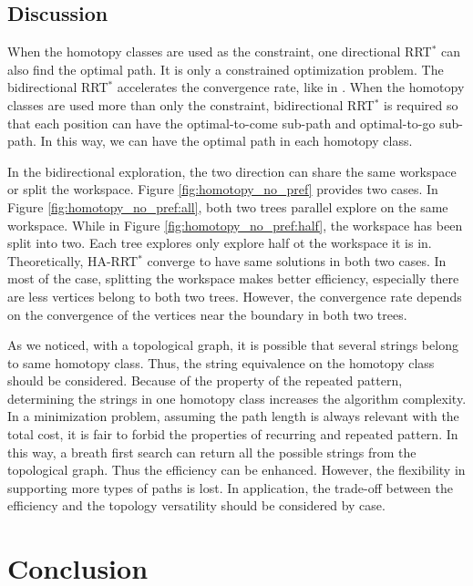 \documentclass[letterpaper, 10 pt, conference]{ieeeconf}
\begin{document}
\subsection{Discussion}

When the homotopy classes are used as the constraint, one directional RRT$^{*}$ can also find the optimal path.
It is only a constrained optimization problem.
The bidirectional RRT$^{*}$ accelerates the convergence rate, like in \cite{starek2014bidirectional}.
When the homotopy classes are used more than only the constraint, bidirectional RRT$^{*}$ is required so that each position can have the optimal-to-come sub-path and optimal-to-go sub-path.
In this way, we can have the optimal path in each homotopy class.

In the bidirectional exploration, the two direction can share the same workspace or split the workspace.
Figure \ref{fig:homotopy_no_pref} provides two cases.
In Figure \ref{fig:homotopy_no_pref:all}, both two trees parallel explore on the same workspace.
While in Figure \ref{fig:homotopy_no_pref:half}, the workspace has been split into two.
Each tree explores only explore half ot the workspace it is in.
Theoretically, HA-RRT$^{*}$ converge to have same solutions in both two cases.
In most of the case, splitting the workspace makes better efficiency, especially there are less vertices belong to both two trees.
However, the convergence rate depends on the convergence of the vertices near the boundary in both two trees.

As we noticed, with a topological graph, it is possible that several strings belong to same homotopy class.
Thus, the string equivalence on the homotopy class should be considered.
Because of the property of the repeated pattern, determining the strings in one homotopy class increases the algorithm complexity.
In a minimization problem, assuming the path length is always relevant with the total cost, it is fair to forbid the properties of recurring and repeated pattern.
In this way, a breath first search can return all the possible strings from the topological graph.
Thus the efficiency can be enhanced.
However, the flexibility in supporting more types of paths is lost.
In application, the trade-off between the efficiency and the topology versatility should be considered by case.

\section{Conclusion}
\label{sec:conclusion}
\end{document}
